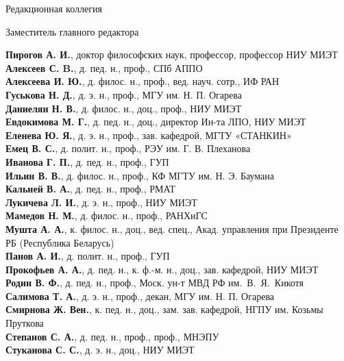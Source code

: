 \begin{minipage}[t]{.48\textwidth}
    
    \begin{flushleft}
        \footnotesize
Редакционная коллегия

Заместитель главного редактора

\textbf{Пирогов А. И.}, доктор философских наук, профессор,
профессор НИУ МИЭТ\\
\textbf{Алексеев С. B.}, д. пед. н., проф., СПб АППО\\
\textbf{Алексеева И. Ю.}, д. филос. н., проф., вед. науч. сотр.,
ИФ РАН\\
\textbf{Гуськова Н. Д.}, д. э. н., проф., МГУ им. Н. П. Огарева\\
\textbf{Даниелян Н. В.}, д. филос. н., доц., проф., НИУ МИЭТ\\
\textbf{Евдокимова М. Г.}, д. пед. н., доц.,
директор Ин-та ЛПО, НИУ МИЭТ\\
\textbf{Еленева Ю. Я.}, д. э. н., проф., зав. кафедрой,
МГТУ «СТАНКИН»\\
\textbf{Емец В. С.}, д. полит. н., проф., РЭУ им. Г. В. Плеханова\\
\textbf{Иванова Г. П.}, д. пед. н., проф., ГУП\\
\textbf{Ильин В. В.}, д. филос. н., проф.,
КФ МГТУ им. Н. Э. Баумана\\
\textbf{Кальней В. А.}, д. пед. н., проф., РМАТ\\
\textbf{Лукичева Л. И.}, д. э. н., проф., НИУ МИЭТ\\
\textbf{Мамедов Н. М.}, д. филос. н., проф., РАНХиГС\\
\textbf{Мушта А. А.}, к. филос. н., доц., вед. спец., Акад. управления при Президенте РБ (Республика Беларусь)\\
\textbf{Панов А. И.}, д. полит. н., проф., ГУП\\
\textbf{Прокофьев А. А.}, д. пед. н., к. ф.-м. н., доц.,
зав. кафедрой, НИУ МИЭТ\\
\textbf{Родин В. Ф.}, д. пед. н., проф., Моск. ун-т МВД РФ
им. В. Я. Кикотя\\
\textbf{Салимова Т. А.}, д. э. н., проф.,
декан, МГУ им. Н. П. Огарева\\
\textbf{Смирнова Ж. Вен.}, к. пед. н., доц., зам. зав. кафедрой,
НГПУ им. Козьмы Пруткова\\
\textbf{Степанов С. А.}, д. пед. н., проф., проф., МНЭПУ\\
\textbf{Стуканова С. С.}, д. э. н., доц., НИУ МИЭТ
\end{flushleft}
\end{minipage}


